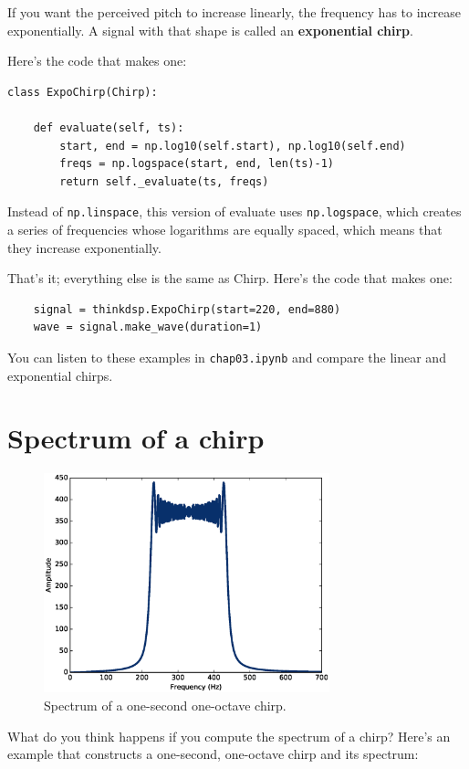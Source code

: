 \documentclass[12pt]{book}
\begin{document}
If you want the perceived pitch to increase linearly, the frequency
has to increase exponentially.  A signal with that shape is called
an {\bf exponential chirp}.

Here's the code that makes one:

\begin{verbatim}
class ExpoChirp(Chirp):
    
    def evaluate(self, ts):
        start, end = np.log10(self.start), np.log10(self.end)
        freqs = np.logspace(start, end, len(ts)-1)
        return self._evaluate(ts, freqs)
\end{verbatim}

Instead of {\tt np.linspace}, this version of evaluate uses
{\tt np.logspace}, which creates a series of frequencies
whose logarithms are equally spaced, which means that they increase
exponentially.

That's it; everything else is the same as Chirp.  Here's the code
that makes one:

\begin{verbatim}
    signal = thinkdsp.ExpoChirp(start=220, end=880)
    wave = signal.make_wave(duration=1)
\end{verbatim}

You can listen to these examples in {\tt chap03.ipynb} and compare
the linear and exponential chirps.  


\section{Spectrum of a chirp}
\label{sauron}

\begin{figure}
\centerline{\includegraphics[height=2.5in]{figs/chirp1.eps}}
\caption{Spectrum of a one-second one-octave chirp.}
\label{fig.chirp1}
\end{figure}

What do you think happens if you compute the spectrum of a chirp?
Here's an example that constructs a one-second, one-octave chirp and
its spectrum:
\end{document}

